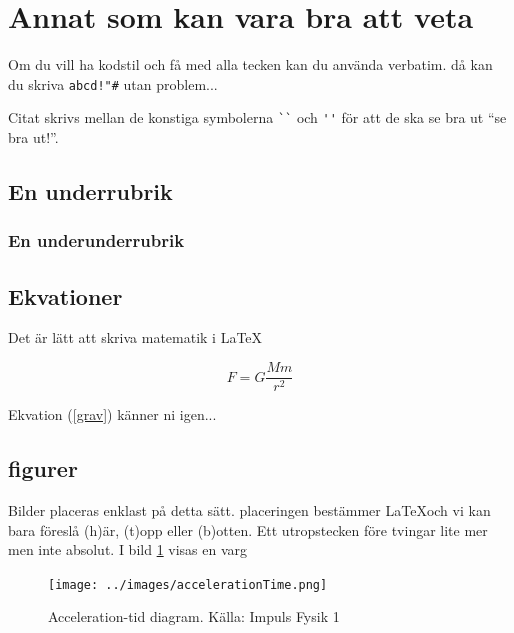 \documentclass[11p]{article}
\begin{document}
    \section{Annat som kan vara bra att veta}
    Om du vill ha kodstil och få med alla tecken kan du använda verbatim. då kan du skriva \verb|abcd!"#| utan problem...

    Citat skrivs mellan de konstiga symbolerna \verb|``| och \verb|''| för att de ska se bra ut ``se bra ut!''.
    \subsection{En underrubrik}
    \subsubsection{En underunderrubrik}
    \subsection{Ekvationer}
    Det är lätt att skriva matematik i \LaTeX

    \begin{equation}
        F = G \frac{M m}{r^2}
        \label{grav}
    \end{equation}

    Ekvation (\ref{grav}) känner ni igen...

    \subsection{figurer}
    Bilder placeras enklast på detta sätt. placeringen bestämmer \LaTeX och vi kan bara föreslå (h)är, (t)opp eller (b)otten. Ett utropstecken före tvingar lite mer men inte absolut. I bild \ref{varg} visas en varg
    \begin{figure}[!h]
        \texttt{[image: ../images/accelerationTime.png]}
        \caption{Acceleration-tid diagram. Källa: Impuls Fysik 1}
        \label{varg}
    \end{figure}
    \printbibliography
\end{document}
